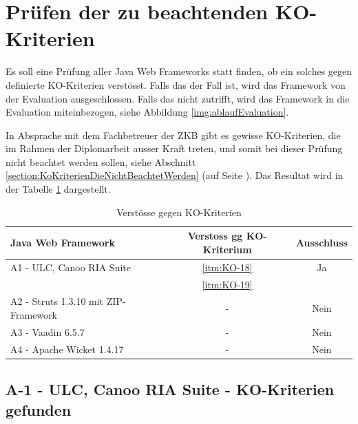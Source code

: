   \section{Prüfen der zu beachtenden KO-Kriterien}
  
  Es soll eine Prüfung aller Java Web Frameworks statt finden, ob ein solches
  gegen definierte KO-Kriterien verstösst. Falls das der Fall ist, wird das
  Framework von der Evaluation ausgeschlossen. Falls das nicht zutrifft, wird
  das Framework in die Evaluation miteinbezogen, siehe Abbildung
  \ref{img:ablaufEvaluation}.
  
  In Absprache mit dem Fachbetreuer der \ac{ZKB} gibt es gewisse KO-Kriterien,
  die im Rahmen der Diplomarbeit ausser Kraft treten, und somit bei dieser
  Prüfung nicht beachtet werden sollen, siehe Abschnitt
  \ref{section:KoKriterienDieNichtBeachtetWerden}
   (auf Seite
  \pageref{section:KoKriterienDieNichtBeachtetWerden}). Das Resultat wird in
  der Tabelle \ref{tab:gefundeneKOKriterien} dargestellt.
  \newline
  
  \begin{table}[!h]
    \sffamily 
    \begin{center}
      \begin{tabular}{lcc}
        \toprule
        Java Web Framework & Verstoss gg KO-Kriterium & Ausschluss\\
        \midrule
        A1 - ULC, Canoo RIA Suite & \ref{itm:KO-18} & Ja\\
        & \ref{itm:KO-19} &\\
        A2 - Struts 1.3.10 mit ZIP-Framework & - & Nein\\
        A3 - Vaadin 6.5.7 & - & Nein\\
        A4 - Apache Wicket 1.4.17 & - & Nein\\
        \bottomrule
      \end{tabular}
      \caption{Verstösse gegen KO-Kriterien}
      \label{tab:gefundeneKOKriterien}
    \end{center}
  \end{table}

  \subsection{A-1 - ULC, Canoo RIA Suite - KO-Kriterien gefunden}
  

